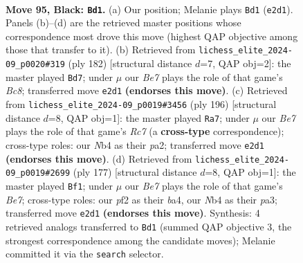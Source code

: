 \documentclass[11pt]{article}
\begin{document}
\clearpage

\begin{figure}[p]\centering
\begin{subfigure}{0.46\textwidth}\centering
\resizebox{\linewidth}{!}{%
\newchessgame
\chessboard[
  setfen={8/7k/8/8/1n3K2/8/1B2bP2/8 b - - 36 95},
  showmover=false,
  pgfstyle=straightmove, color=movearrow, markmove={e2-d1}
]}
\caption{}
\end{subfigure}\hfill
\begin{subfigure}{0.46\textwidth}\centering
\resizebox{\linewidth}{!}{%
\newchessgame
\chessboard[
  setfen={1bB5/4K3/8/7p/4N2k/8/8/8 w - - 56 92},
  showmover=false,
  pgfstyle=straightmove, color=movearrow, markmove={c8-d7}
]}
\caption{}
\end{subfigure}
\\[4pt]
\begin{subfigure}{0.46\textwidth}\centering
\resizebox{\linewidth}{!}{%
\newchessgame
\chessboard[
  setfen={5k2/2R5/8/8/4K3/8/p7/b7 w - - 0 99},
  showmover=false,
  pgfstyle=straightmove, color=movearrow, markmove={c7-a7}
]}
\caption{}
\end{subfigure}\hfill
\begin{subfigure}{0.46\textwidth}\centering
\resizebox{\linewidth}{!}{%
\newchessgame
\chessboard[
  setfen={8/8/8/8/B2k4/P7/3Kb3/8 b - - 0 89},
  showmover=false,
  pgfstyle=straightmove, color=movearrow, markmove={e2-f1}
]}
\caption{}
\end{subfigure}
\caption{\textbf{Move 95, Black: \texttt{Bd1}.} (a) Our position; Melanie plays \texttt{Bd1} (\texttt{e2d1}). Panels (b)--(d) are the retrieved master positions whose correspondence most drove this move (highest QAP objective among those that transfer to it). (b) Retrieved from \texttt{lichess\_elite\_2024-09\_p0020\#319} (ply 182) [structural distance $d$=7, QAP obj=2]: the master played \texttt{Bd7}; under $\mu$ our \emph{Be7} plays the role of that game's \emph{Bc8}; transferred move \texttt{e2d1} \textbf{(endorses this move)}. (c) Retrieved from \texttt{lichess\_elite\_2024-09\_p0019\#3456} (ply 196) [structural distance $d$=8, QAP obj=1]: the master played \texttt{Ra7}; under $\mu$ our \emph{Be7} plays the role of that game's \emph{Rc7} (a \textbf{cross-type} correspondence); cross-type roles: our \emph{N}b4 as their \emph{p}a2; transferred move \texttt{e2d1} \textbf{(endorses this move)}. (d) Retrieved from \texttt{lichess\_elite\_2024-09\_p0019\#2699} (ply 177) [structural distance $d$=8, QAP obj=1]: the master played \texttt{Bf1}; under $\mu$ our \emph{Be7} plays the role of that game's \emph{Be7}; cross-type roles: our \emph{p}f2 as their \emph{b}a4, our \emph{N}b4 as their \emph{p}a3; transferred move \texttt{e2d1} \textbf{(endorses this move)}. Synthesis: 4 retrieved analogs transferred to \texttt{Bd1} (summed QAP objective 3, the strongest correspondence among the candidate moves); Melanie committed it via the \texttt{search} selector.}
\label{fig:thought-m189}
\end{figure}
\end{document}
